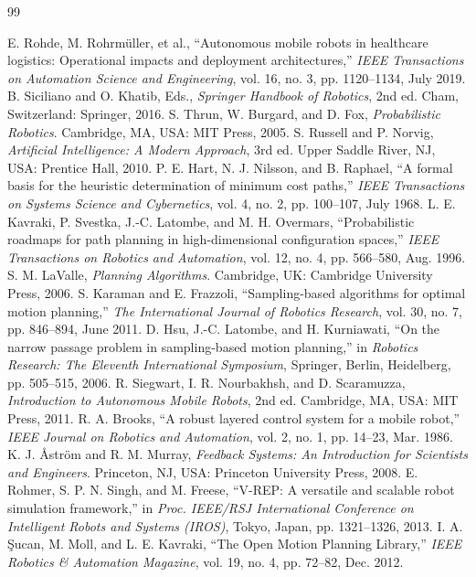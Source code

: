 \documentclass[12pt,a4paper]{article}
\begin{document}
\begin{thebibliography}{99}
 E. Rohde, M. Rohrm{\"u}ller, et al., ``Autonomous mobile robots in healthcare logistics: Operational impacts and deployment architectures,'' \textit{IEEE Transactions on Automation Science and Engineering}, vol. 16, no. 3, pp. 1120--1134, July 2019.
 B. Siciliano and O. Khatib, Eds., \textit{Springer Handbook of Robotics}, 2nd ed. Cham, Switzerland: Springer, 2016.
 S. Thrun, W. Burgard, and D. Fox, \textit{Probabilistic Robotics}. Cambridge, MA, USA: MIT Press, 2005.
 S. Russell and P. Norvig, \textit{Artificial Intelligence: A Modern Approach}, 3rd ed. Upper Saddle River, NJ, USA: Prentice Hall, 2010.
 P. E. Hart, N. J. Nilsson, and B. Raphael, ``A formal basis for the heuristic determination of minimum cost paths,'' \textit{IEEE Transactions on Systems Science and Cybernetics}, vol. 4, no. 2, pp. 100--107, July 1968.
 L. E. Kavraki, P. Svestka, J.-C. Latombe, and M. H. Overmars, ``Probabilistic roadmaps for path planning in high-dimensional configuration spaces,'' \textit{IEEE Transactions on Robotics and Automation}, vol. 12, no. 4, pp. 566--580, Aug. 1996.
 S. M. LaValle, \textit{Planning Algorithms}. Cambridge, UK: Cambridge University Press, 2006.
 S. Karaman and E. Frazzoli, ``Sampling-based algorithms for optimal motion planning,'' \textit{The International Journal of Robotics Research}, vol. 30, no. 7, pp. 846--894, June 2011.
 D. Hsu, J.-C. Latombe, and H. Kurniawati, ``On the narrow passage problem in sampling-based motion planning,'' in \textit{Robotics Research: The Eleventh International Symposium}, Springer, Berlin, Heidelberg, pp. 505--515, 2006.
 R. Siegwart, I. R. Nourbakhsh, and D. Scaramuzza, \textit{Introduction to Autonomous Mobile Robots}, 2nd ed. Cambridge, MA, USA: MIT Press, 2011.
 R. A. Brooks, ``A robust layered control system for a mobile robot,'' \textit{IEEE Journal on Robotics and Automation}, vol. 2, no. 1, pp. 14--23, Mar. 1986.
 K. J. {\AA}str{\"o}m and R. M. Murray, \textit{Feedback Systems: An Introduction for Scientists and Engineers}. Princeton, NJ, USA: Princeton University Press, 2008.
 E. Rohmer, S. P. N. Singh, and M. Freese, ``V-REP: A versatile and scalable robot simulation framework,'' in \textit{Proc. IEEE/RSJ International Conference on Intelligent Robots and Systems (IROS)}, Tokyo, Japan, pp. 1321--1326, 2013.
 I. A. {\c{S}}ucan, M. Moll, and L. E. Kavraki, ``The Open Motion Planning Library,'' \textit{IEEE Robotics \& Automation Magazine}, vol. 19, no. 4, pp. 72--82, Dec. 2012.
\end{thebibliography}
\end{document}
